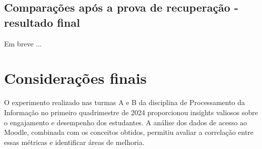 \subsection{Comparações após a prova de recuperação - resultado final}

Em breve ...



\section{Considerações finais}

O experimento realizado nas turmas A e B da disciplina de Processamento da Informação no primeiro quadrimestre de 2024 proporcionou insights valiosos sobre o engajamento e desempenho dos estudantes. A análise dos dados de acesso ao Moodle, combinada com os conceitos obtidos, permitiu avaliar a correlação entre essas métricas e identificar áreas de melhoria.


